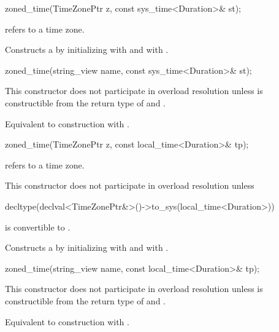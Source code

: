 \begin{itemdecl}
zoned_time(TimeZonePtr z, const sys_time<Duration>& st);
\end{itemdecl}

\begin{itemdescr}
\pnum
\requires {} refers to a time zone.

\pnum
\effects
Constructs a  by
initializing  with  and  with .
\end{itemdescr}

\begin{itemdecl}
zoned_time(string_view name, const sys_time<Duration>& st);
\end{itemdecl}

\begin{itemdescr}
\pnum
\remarks
This constructor does not participate in overload resolution unless
 is constructible from the return type of  and .

\pnum
\effects
Equivalent to construction with .
\end{itemdescr}

\begin{itemdecl}
zoned_time(TimeZonePtr z, const local_time<Duration>& tp);
\end{itemdecl}

\begin{itemdescr}
\pnum
\requires {} refers to a time zone.

\pnum
\remarks
This constructor does not participate in overload resolution unless
\begin{codeblock}
decltype(declval<TimeZonePtr&>()->to_sys(local_time<Duration>{}))
\end{codeblock}
is convertible to .

\pnum
\effects
Constructs a  by
initializing  with  and  with .
\end{itemdescr}

\begin{itemdecl}
zoned_time(string_view name, const local_time<Duration>& tp);
\end{itemdecl}

\begin{itemdescr}
\pnum
\remarks
This constructor does not participate in overload resolution unless
 is constructible from the return type of  and .

\pnum
\effects
Equivalent to construction with .
\end{itemdescr}

